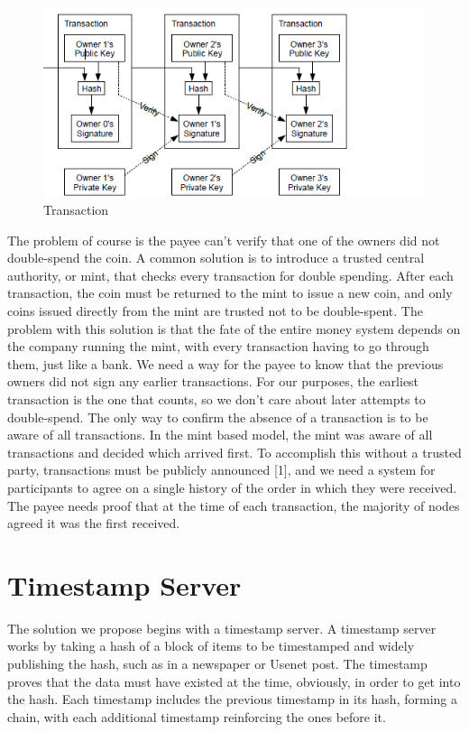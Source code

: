 \begin{figure}[ht!]
\centering
\includegraphics[trim = 0mm 0mm 30mm 0mm, width=120mm]{images/transaction}
\caption{Transaction}
\end{figure}

The problem of course is the payee can't verify that one of the owners did not double-spend
the coin. A common solution is to introduce a trusted central authority, or mint, that checks every
transaction for double spending. After each transaction, the coin must be returned to the mint to
issue a new coin, and only coins issued directly from the mint are trusted not to be double-spent.
The problem with this solution is that the fate of the entire money system depends on the
company running the mint, with every transaction having to go through them, just like a bank.
We need a way for the payee to know that the previous owners did not sign any earlier
transactions. For our purposes, the earliest transaction is the one that counts, so we don't care
about later attempts to double-spend. The only way to confirm the absence of a transaction is to
be aware of all transactions. In the mint based model, the mint was aware of all transactions and
decided which arrived first. To accomplish this without a trusted party, transactions must be
publicly announced [1], and we need a system for participants to agree on a single history of the
order in which they were received. The payee needs proof that at the time of each transaction, the
majority of nodes agreed it was the first received.

\section{Timestamp Server}

The solution we propose begins with a timestamp server. A timestamp server works by taking a hash of a block of items to be timestamped and widely publishing the hash, such as in a newspaper or Usenet post. The timestamp proves that the data must have existed at the time, obviously, in order to get into the hash. Each timestamp includes the previous timestamp in its hash, forming a chain, with each additional timestamp reinforcing the ones before it.

